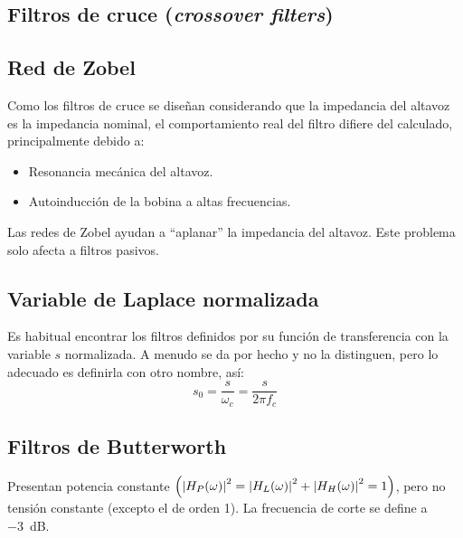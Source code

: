 \documentclass[a4paper, 8pt]{extarticle}
\begin{document}
\begin{multicols}{3}
    \vfill\null
    \columnbreak

    \section{Filtros de cruce (\textit{crossover filters})}

    \subsection{Red de Zobel}
    Como los filtros de cruce se diseñan considerando que la impedancia del altavoz es la impedancia nominal, el comportamiento real del filtro difiere del calculado, principalmente debido a:

    \begin{itemize}
        \item Resonancia mecánica del altavoz.
        \item Autoinducción de la bobina a altas frecuencias.
    \end{itemize}
    Las redes de Zobel ayudan a ``aplanar'' la impedancia del altavoz. Este problema solo afecta a filtros pasivos.

    \subsection{Variable de Laplace normalizada}
    Es habitual encontrar los filtros definidos por su función de transferencia con la variable $s$ normalizada. A menudo se da por hecho y no la distinguen, pero lo adecuado es definirla con otro nombre, así:
    \[s_0 = \frac{s}{\omega_c} = \frac{s}{2 \pi f_c}\]

    \subsection{Filtros de Butterworth}

    Presentan potencia constante $\left( \abs{H_P (\omega)}^2 = \abs{H_L (\omega )}^2 + \abs{H_H (\omega )}^2   = 1\right)$, pero no tensión constante (excepto el de orden 1). La frecuencia de corte se define a \qty{-3}{\dB}.


\end{multicols}
\end{document}
